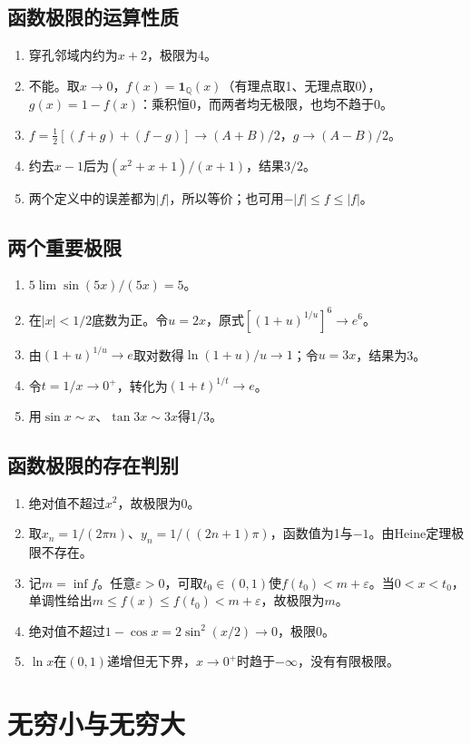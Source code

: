 \documentclass[11pt,a4paper,fontset=fandol]{ctexrep}
\begin{document}
\subsection{函数极限的运算性质}
\begin{enumerate}
\item 穿孔邻域内约为$x+2$，极限为4。
\item 不能。取$x\to0$，$f(x)=\mathbf1_{\mathbb Q}(x)$（有理点取1、无理点取0），$g(x)=1-f(x)$：乘积恒0，而两者均无极限，也均不趋于0。
\item $f=\frac12[(f+g)+(f-g)]\to(A+B)/2$，$g\to(A-B)/2$。
\item 约去$x-1$后为$(x^2+x+1)/(x+1)$，结果$3/2$。
\item 两个定义中的误差都为$|f|$，所以等价；也可用$-|f|\le f\le|f|$。
\end{enumerate}
\subsection{两个重要极限}
\begin{enumerate}
\item $5\lim\sin(5x)/(5x)=5$。
\item 在$|x|<1/2$底数为正。令$u=2x$，原式$[(1+u)^{1/u}]^6\to e^6$。
\item 由$(1+u)^{1/u}\to e$取对数得$\ln(1+u)/u\to1$；令$u=3x$，结果为3。
\item 令$t=1/x\to0^+$，转化为$(1+t)^{1/t}\to e$。
\item 用$\sin x\sim x$、$\tan3x\sim3x$得$1/3$。
\end{enumerate}
\subsection{函数极限的存在判别}
\begin{enumerate}
\item 绝对值不超过$x^2$，故极限为0。
\item 取$x_n=1/(2\pi n)$、$y_n=1/((2n+1)\pi)$，函数值为1与$-1$。由Heine定理极限不存在。
\item 记$m=\inf f$。任意$\varepsilon>0$，可取$t_0\in(0,1)$使$f(t_0)<m+\varepsilon$。当$0<x<t_0$，单调性给出$m\le f(x)\le f(t_0)<m+\varepsilon$，故极限为$m$。
\item 绝对值不超过$1-\cos x=2\sin^2(x/2)\to0$，极限0。
\item $\ln x$在$(0,1)$递增但无下界，$x\to0^+$时趋于$-\infty$，没有有限极限。
\end{enumerate}
\section{无穷小与无穷大}
\end{document}
